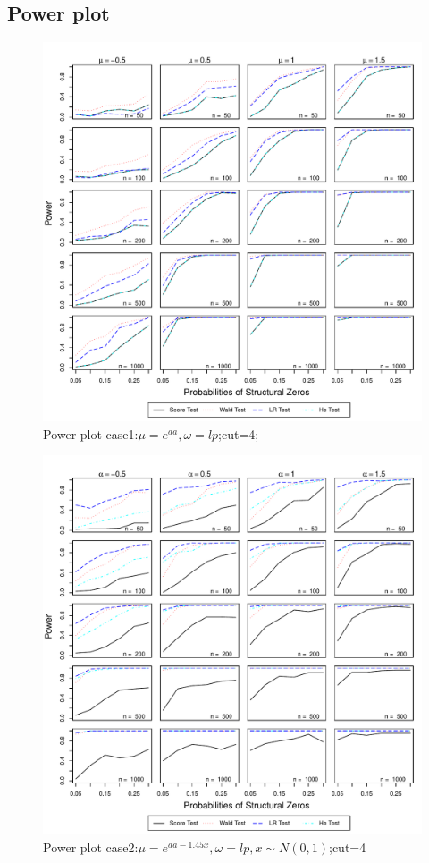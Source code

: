 \documentclass[11pt]{article}
\numberwithin{equation}{section}
\begin{document}
\subsection{Power plot}
\begin{figure}
  \centering
  \includegraphics[width=\columnwidth]{./figure/p/p41.pdf}
  \caption{Power plot case1:$\mu=e^{aa},\omega=lp$;cut=4;}
\end{figure}

\begin{figure}
  \centering
  \includegraphics[width=\columnwidth]{./figure/p/p42.pdf}
  \caption{Power plot case2:$\mu=e^{aa-1.45x},\omega=lp,x\sim N(0,1)$;cut=4}
\end{figure}
\end{document}

